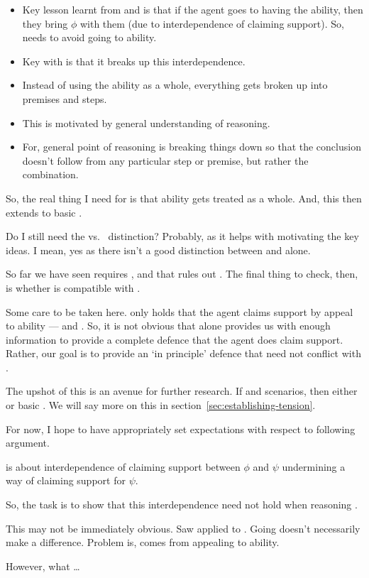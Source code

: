 {
  \color{red}
  \begin{itemize}
  \item Key lesson learnt from \nI{} and \adA{} is that if the agent goes to having the ability, then they bring \(\phi\) with them (due to interdependence of claiming support).
    So, \adB{} needs to avoid going to ability.
  \item Key with \adB{} is that it breaks up this interdependence.
  \item Instead of using the ability as a whole, everything gets broken up into premises and steps.
  \item This is motivated by general understanding of reasoning.
  \item For, general point of reasoning is breaking things down so that the conclusion doesn't follow from any particular step or premise, but rather the combination.
  \end{itemize}

  So, the real thing I need for \adA{} is that ability gets treated as a whole.
  And, this then extends to basic \AR{}.

  Do I still need the \adB{} vs.\ \adA{} distinction?
  Probably, as it helps with motivating the key ideas.
  I mean, yes as there isn't a good distinction between \AR{} and \WR{} alone.
}

\begin{note}
  So far we have seen \ESU{} requires \adA{}, and that \nI{} rules out \adA{}.
  The final thing to check, then, is whether \adB{} is compatible with \nI{}.

  Some care to be taken here.
  \adB{} only holds that the agent claims support by appeal to ability --- \AR{} and \WR{}.
  So, it is not obvious that \adB{} alone provides us with enough information to provide a complete defence that the agent does claim support.
  Rather, our goal is to provide an `in principle' defence that \adB{} need not conflict with \nI{}.

  The upshot of this is an avenue for further research.
  If \nI{} and scenarios, then either \adB{} or basic \AR{}.
  We will say more on this in section~\ref{sec:establishing-tension}.

  For now, I hope to have appropriately set expectations with respect to following argument.
\end{note}

\begin{note}
  \nI{} is about interdependence of claiming support between \(\phi\) and \(\psi\) undermining a way of claiming support for \(\psi\).

  So, the task is to show that this interdependence need not hold when reasoning \adB{}.

  This may not be immediately obvious.
  Saw \nI{} applied to \adA{}.
  Going \adB{} doesn't necessarily make a difference.
  {
    \color{red}
    Problem is, comes from appealing to ability.
  }

  However, what \adB{} \dots
\end{note}

